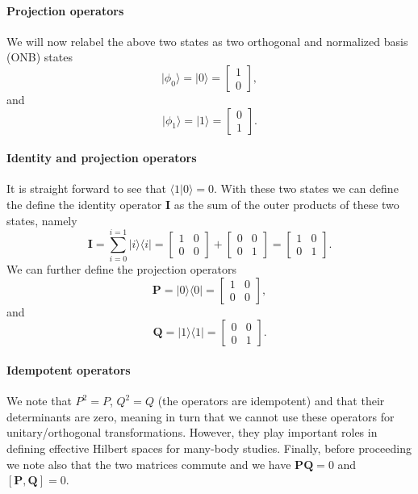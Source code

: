 \paragraph{Projection operators}

We will now relabel the above two states as two orthogonal and normalized basis (ONB) states 
\[
\vert \phi_0 \rangle = \vert 0 \rangle = \begin{bmatrix} 1 \\ 0 \end{bmatrix},
\]
and 
\[
\vert \phi_1 \rangle = \vert 1 \rangle = \begin{bmatrix} 0 \\ 1 \end{bmatrix}.
\]


\paragraph{Identity and projection operators}

It is straight forward to see that $\langle 1 \vert 0\rangle=0$. With these two states we can define the define the identity operator $\bm{I}$ as the sum of the outer products of these two states, namely
\[
\bm{I} = \sum_{i=0}^{i=1}\vert i\rangle \langle i\vert = \begin{bmatrix} 1 & 0 \\ 0 & 0 \end{bmatrix} +\begin{bmatrix} 0 & 0 \\ 0 & 1 \end{bmatrix}=\begin{bmatrix} 1 & 0 \\ 0 & 1 \end{bmatrix}.
\]
We can further define the projection operators
\[
\bm{P} = \vert 0\rangle \langle 0\vert = \begin{bmatrix} 1 & 0 \\ 0 & 0 \end{bmatrix},
\]
and 
\[
\bm{Q} = \vert 1\rangle \langle 1\vert = \begin{bmatrix} 0 & 0 \\ 0 & 1 \end{bmatrix}.
\]


\paragraph{Idempotent operators}

We note that $P^2=P$, $Q^2=Q$ (the operators are idempotent) and that
their determinants are zero, meaning in turn that we cannot use these
operators for unitary/orthogonal transformations. However, they play
important roles in defining effective Hilbert spaces for many-body
studies. Finally, before proceeding we note also that the two matrices
commute and we have $\bm{P}\bm{Q}=0$ and $\left[ \bm{P},\bm{Q}\right]=0$.


